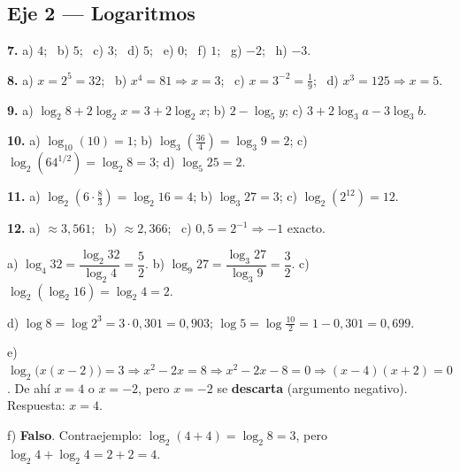 \documentclass[11pt,a4paper]{article}
\begin{document}
\subsection*{Eje 2 --- Logaritmos}

\begin{tcolorbox}[propiedad, title={Ejercicios 7 y 8}]
\textbf{7.} a) $4$; \ b) $5$; \ c) $3$; \ d) $5$; \ e) $0$; \ f) $1$; \ g) $-2$; \ h) $-3$.

\smallskip
\textbf{8.} a) $x = 2^5 = 32$; \ b) $x^4 = 81 \Rightarrow x = 3$; \ c) $x = 3^{-2} = \tfrac{1}{9}$; \ d) $x^3 = 125 \Rightarrow x = 5$.
\end{tcolorbox}

\begin{tcolorbox}[propiedad, title={Ejercicios 9 y 10}]
\textbf{9.} a) $\log_2 8 + 2\log_2 x = 3 + 2\log_2 x$; \quad
b) $2 - \log_5 y$; \quad
c) $3 + 2\log_3 a - 3\log_3 b$.

\smallskip
\textbf{10.} a) $\log_{10}(10) = 1$; \quad
b) $\log_3\!\left(\tfrac{36}{4}\right) = \log_3 9 = 2$; \quad
c) $\log_2\!\left(64^{1/2}\right) = \log_2 8 = 3$; \quad
d) $\log_5 25 = 2$.
\end{tcolorbox}

\begin{tcolorbox}[propiedad, title={Ejercicios 11 y 12}]
\textbf{11.} a) $\log_2\!\left(6\cdot\tfrac{8}{3}\right) = \log_2 16 = 4$; \quad
b) $\log_3 27 = 3$; \quad
c) $\log_2\!\left(2^{12}\right) = 12$.

\smallskip
\textbf{12.} a) $\approx 3{,}561$; \ b) $\approx 2{,}366$; \ c) $0{,}5 = 2^{-1} \Rightarrow -1$ exacto.
\end{tcolorbox}

\begin{tcolorbox}[propiedad, title={Ejercicio 13 (desafíos)}]
a) $\log_4 32 = \dfrac{\log_2 32}{\log_2 4} = \dfrac{5}{2}$.
\quad b) $\log_9 27 = \dfrac{\log_3 27}{\log_3 9} = \dfrac{3}{2}$.
\quad c) $\log_2(\log_2 16) = \log_2 4 = 2$.

\smallskip
d) $\log 8 = \log 2^3 = 3\cdot 0{,}301 = 0{,}903$; \quad
$\log 5 = \log\tfrac{10}{2} = 1 - 0{,}301 = 0{,}699$.

\smallskip
e) $\log_2\big(x(x-2)\big) = 3 \Rightarrow x^2 - 2x = 8 \Rightarrow x^2 - 2x - 8 = 0 \Rightarrow (x-4)(x+2) = 0$.
De ahí $x = 4$ o $x = -2$, pero $x = -2$ se \textbf{descarta} (argumento negativo). Respuesta: $x = 4$.

\smallskip
f) \textbf{Falso}. Contraejemplo: $\log_2(4+4) = \log_2 8 = 3$, pero $\log_2 4 + \log_2 4 = 2 + 2 = 4$.
\end{tcolorbox}
\end{document}
